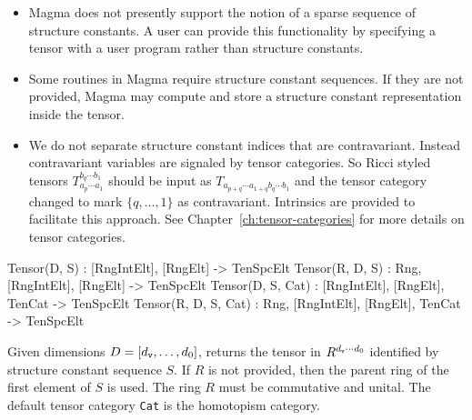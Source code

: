 \begin{itemize}
\item \textsf{Magma} does not presently support the notion of a sparse sequence of structure constants.
A user can provide this functionality by specifying a tensor with a user program rather
than structure constants. 

\item Some routines in \textsf{Magma} require structure constant sequences.  If they 
are not provided, \textsf{Magma} may compute and store a structure constant representation
inside the tensor.

\item We do not separate structure constant indices that are contravariant.
Instead contravariant variables are signaled by tensor categories.  So Ricci
styled tensors $T_{a_p\cdots a_1}^{b_q\cdots b_1}$ should be input as
$T_{a_{p+q}\cdots a_{1+q} b_q\cdots b_1}$ and the tensor category changed to
mark $\{q,\dots,1\}$ as contravariant. Intrinsics are provided to facilitate
this approach. See Chapter~\ref{ch:tensor-categories} for more details on tensor
categories.
\end{itemize}
\medskip

\begin{intrinsics}
Tensor(D, S) : [RngIntElt], [RngElt] -> TenSpcElt
Tensor(R, D, S) : Rng, [RngIntElt], [RngElt] -> TenSpcElt
Tensor(D, S, Cat) : [RngIntElt], [RngElt], TenCat -> TenSpcElt
Tensor(R, D, S, Cat) : Rng, [RngIntElt], [RngElt], TenCat -> TenSpcElt
\end{intrinsics}

Given dimensions $D=[d_{\operatorname{\mathtt{v}}},\dots,d_0]$, returns the tensor in
$R^{d_{\operatorname{\mathtt{v}}}\cdots d_0}$ identified by structure constant sequence $S$. If $R$
is not provided, then the parent ring of the first element of $S$ is used. The
ring $R$ must be commutative and unital. The default tensor category
\texttt{Cat} is the homotopism category.


